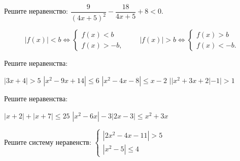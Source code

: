 \begin{class}[number=5]
	
	\begin{listofex}
		\item Решите неравенство: \( \dfrac{ 9 }{ (4x+5)^2 } - \dfrac{ 18 }{ 4x+5 } + 8 < 0 \).
	\end{listofex}
	\begin{definit}
		\[ |f(x)|<b \Leftrightarrow \begin{cases} f(x)<b \\ f(x) > -b, \end{cases} \qquad |f(x)|>b \Leftrightarrow \begin{cases} f(x)>b \\ f(x) < -b. \end{cases} \]
	\end{definit}
	\begin{listofex}[resume]
		\item Решите неравенства: %
		\begin{tasks}
			\task \( |3x+4| > 5 \)
			\task \( |x^2-9x+14| \le 6 \)
			\task \( |x^2-4x-8| \le x-2 \)
			\task \( ||x^2+3x+2| - 1| > 1 \)
			
		\end{tasks}
		\item Решите неравенства: %
		\begin{tasks}
			\task \( |x+2|+|x+7| \le 25 \)
			\task \( |x^2-6x|-3|2x-3| \le x^2+3x \)
		\end{tasks}
		\item Решите систему неравенств: \( \begin{cases} |2x^2-4x-11| > 5 \\ |x^2-5| \le 4 \end{cases} \)
	\end{listofex}
\end{class}

